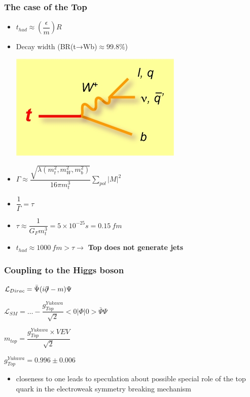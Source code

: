 \documentclass[9pt, xcolor=dvipsnames]{beamer}
\begin{document}
\begin{frame}
\frametitle{The case of the Top}
 \begin{itemize}
   \item $t_{had}\approx(\dfrac{\epsilon}{m})R$
\item Decay width (BR(t→Wb)$\approx99.8\%$)
\medskip
\begin{center}
\includegraphics[scale=0.3]{top}
\end{center}
\pause
\item $\Gamma\approx\dfrac{\sqrt{\lambda(m^{2}_{t},m^{2}_{W},m^{2}_{b})}}{16\pi m^{3}_{t}}\sum_{pol}|M|^{2}$
\item $\dfrac{1}{\Gamma}=\tau$
\pause
\item $\tau\approx\dfrac{1}{G_{F}m^{3}_{t}}=5\times 10^{-25} s=0.15 ~fm$
\item $t_{had}\approx 1000 ~fm > \tau\rightarrow$ \textbf{Top does not generate jets}
  \end{itemize} 
\end{frame}

\begin{frame}
 \frametitle{Coupling to the Higgs boson}
\begin{block}{}
\begin{center}
 $\mathcal{L}_{Dirac}=\bar\Psi(i\partial\kern-0.45em/ -m)\Psi$
\end{center}
\begin{center}
\pause
$\mathcal{L}_{SM}=\dots-\dfrac{g^{Yukawa}_{Top}}{\sqrt{2}}<0|\Phi|0>\bar\Psi\Psi$

\medskip
\pause
$m_{top}=\dfrac{g^{Yukawa}_{Top}\times VEV}{\sqrt{2}}$

\medskip
\pause
$g^{Yukawa}_{Top}=0.996 \pm 0.006$
\end{center}
\end{block}
\begin{itemize}
\pause
 \item closeness to one leads to speculation about possible special role of the top quark in the
electroweak symmetry breaking mechanism
\end{itemize}
\end{frame}
\end{document}
